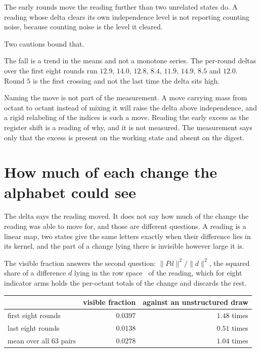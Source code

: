 The early rounds move the reading further than two unrelated states do. A reading whose delta clears its own independence level is not reporting counting noise, because counting noise is the level it cleared.

Two cautions bound that.

The fall is a trend in the means and not a monotone series. The per-round deltas over the first eight rounds run \(12.9\), \(14.0\), \(12.8\), \(8.4\), \(11.9\), \(14.9\), \(8.5\) and \(12.0\). Round \(5\) is the first crossing and not the last time the delta sits high.

Naming the move is not part of the measurement. A move carrying mass from octant to octant instead of mixing it will raise the delta above independence, and a rigid relabeling of the indices is such a move. Reading the early excess as the register shift is a reading of why, and it is not measured. The measurement says only that the excess is present on the working state and absent on the digest.

\section{How much of each change the alphabet could see}

The delta says the reading moved. It does not say how much of the change the reading was able to move for, and those are different questions. A reading is a linear map, two states give the same letters exactly when their difference lies in its kernel, and the part of a change lying there is invisible however large it is.

The visible fraction answers the second question: \(\| P d \|^2 / \| d \|^2\), the squared share of a difference \(d\) lying in the row space~\cite{src:Golub-and-Van-Loan-2013} of the reading, which for eight indicator arms holds the per-octant totals of the change and discards the rest.

\begin{center}
\begin{tabular}{@{}lrr@{}}
\toprule
 & visible fraction & against an unstructured draw \\
\midrule
first eight rounds & \(0.0397\) & \(1.48\) times \\
last eight rounds & \(0.0138\) & \(0.51\) times \\
mean over all 63 pairs & \(0.0278\) & \(1.04\) times \\
\bottomrule
\end{tabular}
\end{center}

